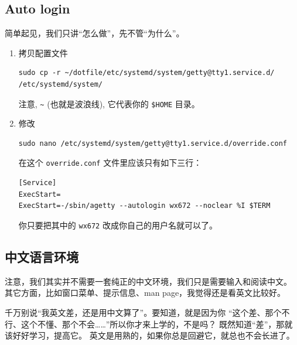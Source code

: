 \documentclass{wx672ctexart} \usepackage{hyperref}
\begin{document}
\subsection{Auto login}
\label{sec:orgb7c3a20}
简单起见，我们只讲“怎么做”，先不管“为什么”。
\begin{enumerate}
\item 拷贝配置文件
\begin{verbatim}
sudo cp -r ~/dotfile/etc/systemd/system/getty@tty1.service.d/ /etc/systemd/system/
\end{verbatim}
注意, \texttt{\textasciitilde{}} (也就是波浪线), 它代表你的 \texttt{\$HOME} 目录。
\item 修改
\begin{verbatim}
sudo nano /etc/systemd/system/getty@tty1.service.d/override.conf
\end{verbatim}
在这个 \texttt{override.conf} 文件里应该只有如下三行：
\begin{verbatim}
[Service]
ExecStart=
ExecStart=-/sbin/agetty --autologin wx672 --noclear %I $TERM
\end{verbatim}
你只要把其中的 \texttt{wx672} 改成你自己的用户名就可以了。
\end{enumerate}

\subsection{中文语言环境}
\label{sec:org41cfbcf}
注意，我们其实并不需要一套纯正的中文环境，我们只是需要输入和阅读中文。
其它方面，比如窗口菜单、提示信息、man page，我觉得还是看英文比较好。

千万别说“我英文差，还是用中文算了”。要知道，就是因为你
“这个差、那个不行、这个不懂、那个不会……”所以你才来上学的，不是吗？
既然知道“差”，那就该好好学习，提高它。
英文是用熟的，如果你总是回避它，就总也不会长进了。
\end{document}
